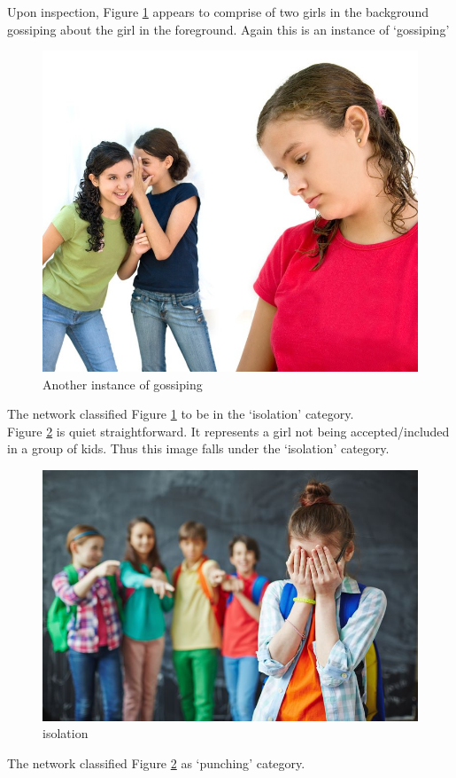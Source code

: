 \documentclass[12pt]{article}
\begin{document}
Upon inspection, Figure \ref{fig:gossip2} appears to comprise of two girls in the background gossiping about the girl in the foreground. Again this is an instance of \lq{gossiping}\rq{}
\begin{figure}[H]
\centering
  \includegraphics[width=.4\linewidth]{./Images/gossiping2.jpg}
  \caption{Another instance of gossiping}
  \label{fig:gossip2}
\end{figure}
The network classified Figure \ref{fig:gossip2} to be in the \lq{isolation}\rq{} category. \\

Figure \ref{fig:isolation} is quiet straightforward. It represents a girl not being accepted/included in a group of kids. Thus this image falls under the \lq{isolation}\rq{} category. \\
\begin{figure}[H]
\centering
  \includegraphics[width=.4\linewidth]{./Images/isolation1.jpg}
  \caption{isolation}
  \label{fig:isolation}
\end{figure}
The network classified Figure \ref{fig:isolation} as \lq{punching}\rq{} category. \\

\newpage
\end{document}

